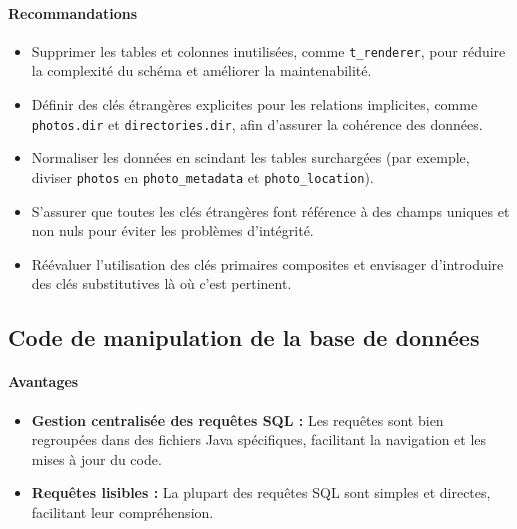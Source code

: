 \paragraph{Recommandations}
\begin{itemize}
    \item Supprimer les tables et colonnes inutilisées, comme \texttt{t_renderer}, pour réduire la complexité du schéma et améliorer la maintenabilité.
    \item Définir des clés étrangères explicites pour les relations implicites, comme \texttt{photos.dir} et \texttt{directories.dir}, afin d'assurer la cohérence des données.
    \item Normaliser les données en scindant les tables surchargées (par exemple, diviser \texttt{photos} en \texttt{photo_metadata} et \texttt{photo_location}).
    \item S'assurer que toutes les clés étrangères font référence à des champs uniques et non nuls pour éviter les problèmes d'intégrité.
    \item Réévaluer l'utilisation des clés primaires composites et envisager d'introduire des clés substitutives là où c'est pertinent.
\end{itemize}

\subsection{Code de manipulation de la base de données}

\paragraph{Avantages}
\begin{itemize}
    \item \textbf{Gestion centralisée des requêtes SQL :} Les requêtes sont bien regroupées dans des fichiers Java spécifiques, facilitant la navigation et les mises à jour du code.
    \item \textbf{Requêtes lisibles :} La plupart des requêtes SQL sont simples et directes, facilitant leur compréhension.
\end{itemize}

